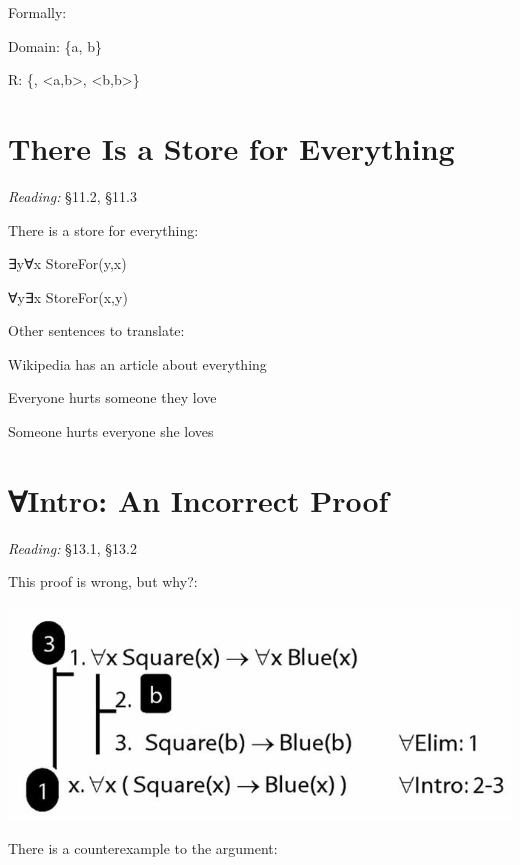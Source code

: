 \documentclass[12pt]{extarticle}
\begin{document}
\begin{multicols*}{3}
Formally:

\hspace{3mm} Domain: \{a, b\}
 
\hspace{3mm} R: \{<a,a>, <a,b>, <b,b>\}
 
 
 
\section{There Is a Store for Everything}
 
\emph{Reading:} §11.2, §11.3
 
There is a store for everything:
 
\hspace{3mm}	∃y∀x StoreFor(y,x)
 
\hspace{3mm} ∀y∃x StoreFor(x,y)
 
Other sentences to translate:
 
\hspace{3mm} Wikipedia has an article about everything
 
\hspace{3mm} Everyone hurts someone they love
 
\hspace{3mm} Someone hurts everyone she loves
 
 
 
\section{∀Intro: An Incorrect Proof}
 
\emph{Reading:} §13.1, §13.2
 
This proof is wrong, but why?:
 
\begin{center}
\includegraphics[scale=0.3]{img/unit_572_proof.png}
\end{center}
There is a counterexample to the argument:
 

\end{multicols*}
\end{document}
